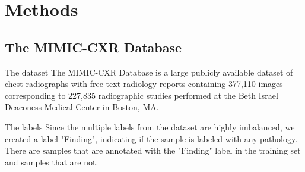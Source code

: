     \begin{frame}{}


    \end{frame}


    \section{Methods}

    \subsection{The MIMIC-CXR Database}
    \begin{frame}{The dataset}
        The MIMIC-CXR Database \cite{johnson2019mimic} is a large publicly available dataset of chest radiographs with free-text radiology reports containing 377,110 images corresponding to 227,835 radiographic studies performed at the Beth Israel Deaconess Medical Center in Boston, MA.

    \end{frame}

    \begin{frame}
    \end{frame}

    \begin{frame}{The labels}
        Since the multiple labels from the dataset are highly imbalanced, we created a label "Finding", indicating if the sample is labeled with any pathology.\\
        There are  samples that are annotated with the "Finding" label in the training set and  samples that are not.
    \end{frame}

